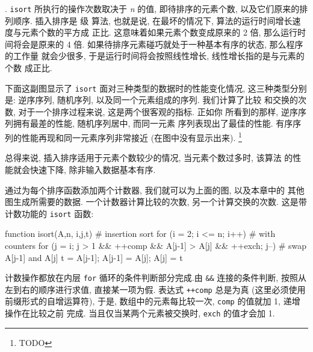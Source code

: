 . \texttt{isort} 所执行的操作次数取决于 \textit{n} 的值,
即待排序的元素个数, 以及它们原来的排列顺序. 插入排序是  级
算法, 也就是说, 在最坏的情况下, 算法的运行时间增长速度与元素个数的平方成
正比. 这意味着如果元素个数变成原来的 2 倍, 那么运行时间将会是原来的
4 倍. 如果待排序元素碰巧就处于一种基本有序的状态, 那么程序的工作量
就会少很多, 于是运行时间将会按照线性增长, 线性增长指的是与元素的个数
成正比.

下面这副图显示了 \texttt{isort} 面对三种类型的数据时的性能变化情况, 
这三种类型分别是: 逆序序列, 随机序列, 以及同一个元素组成的序列. 
我们计算了比较
和交换的次数, 对于一个排序过程来说, 这是两个很客观的指标. 正如你
所看到的那样, 逆序序列拥有最差的性能, 随机序列居中, 而同一元素
序列表现出了最佳的性能. 有序序列的性能再现和同一元素序列非常接近
(在图中没有显示出来). \footnote{TODO}

总得来说, 插入排序适用于元素个数较少的情况, 当元素个数过多时, 该算法
的性能就会快速下降, 除非输入数据基本有序.

通过为每个排序函数添加两个计数器, 我们就可以为上面的图, 以及本章中的
其他图生成所需要的数据. 一个计数器计算比较的次数, 另一个计算交换的次数.
这是带计数功能的 \texttt{isort} 函数:
\begin{awkcode}
    function isort(A,n,     i,j,t) {  # insertion sort
        for (i = 2; i <= n; i++)      # with counters
            for (j = i; j > 1 && ++comp &&
              A[j-1] > A[j] && ++exch; j--) {
                # swap A[j-1] and A[j]
                t = A[j-1]; A[j-1] = A[j]; A[j] = t
            }
    }
\end{awkcode}
计数操作都放在内层 \texttt{for} 循环的条件判断部分完成.由 \verb'&&' 
连接的条件判断, 按照从左到右的顺序进行求值, 直接某一项为假. 表达式
\texttt{++comp} 总是为真 (这里必须使用前缀形式的自增运算符), 于是,
数组中的元素每比较一次, \texttt{comp} 的值就加 1, 递增操作在比较之前
完成. 当且仅当某两个元素被交换时, \texttt{exch} 的值才会加 1.

